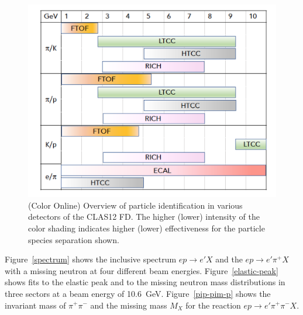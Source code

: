 \documentclass[final,3p,twocolumn]{elsarticle}
\begin{document}
\begin{figure}[tp!]
\centerline{\includegraphics[width=1.1\columnwidth]{CLAS12-pid.png}}
\caption{(Color Online) Overview of particle identification in various detectors of the CLAS12 FD. The higher (lower) intensity
of the color shading indicates higher (lower) effectiveness for the particle species separation shown.} 
\label{pid1}
\end{figure} 

Figure~\ref{spectrum} shows the inclusive spectrum $ep \to e' X$ and the $ep \to e' \pi^+ X$ with a missing
neutron at four different beam energies. Figure~\ref{elastic-peak} shows fits to the elastic peak and to the
missing neutron mass distributions in three sectors at a beam energy of 10.6~GeV. Figure~\ref{pip-pim-p} shows
the invariant mass of $\pi^+\pi^-$ and the missing mass $M_X$ for the reaction $ep \to e' \pi^+ \pi^- X$.  
\end{document}
